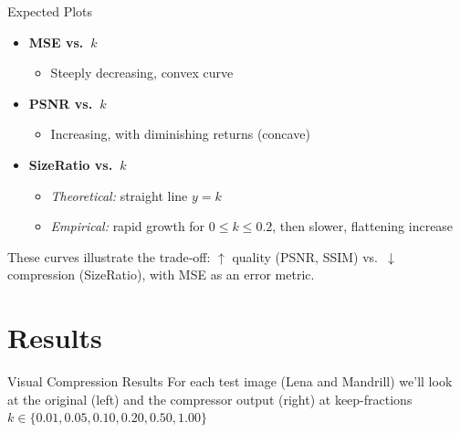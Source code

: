 \documentclass[12pt]{beamer}
\begin{document}
\begin{frame}{Expected Plots}
  \begin{itemize}
    \item \textbf{MSE vs.\ \(k\)}  
      \begin{itemize}
        \item Steeply decreasing, convex curve
      \end{itemize}
    \item \textbf{PSNR vs.\ \(k\)}  
      \begin{itemize}
        \item Increasing, with diminishing returns (concave)
      \end{itemize}
    \item \textbf{SizeRatio vs.\ \(k\)}  
      \begin{itemize}
        \item \emph{Theoretical:} straight line \(y = k\)  
        \item \emph{Empirical:} rapid growth for \(0 \le k \le 0.2\), then slower, flattening increase  
      \end{itemize}
  \end{itemize}

  \vspace{1em}
  \noindent These curves illustrate the trade‑off:
  \(\uparrow\) quality (PSNR, SSIM) vs.\ \(\downarrow\) compression (SizeRatio), with MSE as an error metric.
\end{frame}






\section{Results}

\begin{frame}{Visual Compression Results}
For each test image (Lena and Mandrill) we'll look at the original (left) and the compressor output (right) at keep-fractions $k \in \{0.01,0.05,0.10,0.20,0.50,1.00\}$
\end{frame}
\end{document}
